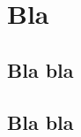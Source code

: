 
    
        
        \section*{Bla}
        
            \subsection*{Bla bla}
                
                \lipsum
                
            
            \subsection*{Bla bla}
                
                \lipsum
            
            
        
    
